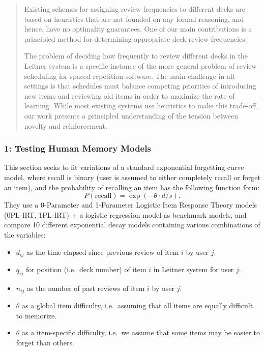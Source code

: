 \begin{quote}
Existing schemes for assigning review frequencies to different decks are
based on heuristics that are not founded on any formal reasoning, and
hence, have no optimality guarantees. One of our main contributions is a
principled method for determining appropriate deck review frequencies.

The problem of deciding how frequently to review different decks in the
Leitner system is a specific instance of the more general problem of
review scheduling for spaced repetition software. The main challenge in
all settings is that schedules must balance competing priorities of
introducing new items and reviewing old items in order to maximize the
rate of learning. While most existing systems use heuristics to make
this trade-off, our work presents a principled understanding of the
tension between novelty and reinforcement.
\end{quote}

\subsubsection{1: Testing Human Memory
Models}\label{testing-human-memory-models}

This section seeks to fit variations of a standard exponential
forgetting curve model, where recall is binary (user is assumed to
either completely recall or forget an item), and the probability of
recalling an item has the following function form: \[
P(\text{recall}) = \exp{(-\theta \cdot d/s)}.
\] They use a 0-Parameter and 1-Parameter Logistic Item Response Theory
models (0PL-IRT, 1PL-IRT) + a logistic regression model as benchmark
models, and compare 10 different exponential decay models containing
various combinations of the variables:

\begin{itemize}
\tightlist
\item
  \(d_{ij}\) as the time elapsed since previous review of item \(i\) by
  user \(j\).
\item
  \(q_{ij}\) for position (i.e.~deck number) of item \(i\) in Leitner
  system for user \(j\).
\item
  \(n_{ij}\) as the number of past reviews of item \(i\) by user \(j\).
\item
  \(\theta\) as a global item difficulty, i.e.~assuming that all items
  are equally difficult to memorize.
\item
  \(\theta\) as a item-specific difficulty, i.e.~we assume that some
  items may be easier to forget than others.
\end{itemize}

